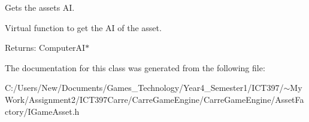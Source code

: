 Gets the assets AI. 

Virtual function to get the AI of the asset.

\begin{Desc}
\item[Returns:]ComputerAI$\ast$ \end{Desc}


The documentation for this class was generated from the following file:\begin{CompactItemize}
\item 
C:/Users/New/Documents/Games\_\-Technology/Year4\_\-Semester1/ICT397/$\sim$My Work/Assignment2/ICT397Carre/CarreGameEngine/CarreGameEngine/AssetFactory/IGameAsset.h\end{CompactItemize}
